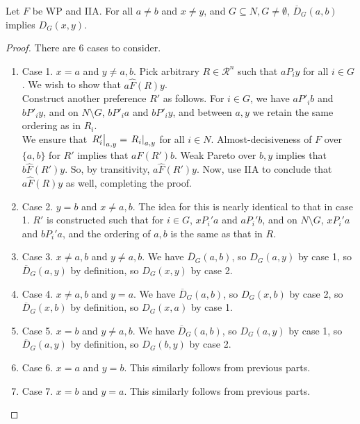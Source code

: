 	\begin{lemma}
		\label{lem: arrow field expansion}
		Let $F$ be WP and IIA. For all $a \ne b$ and $x \ne y$, and $G \subseteq N, G \ne \emptyset$,
		$\overline{D}_G(a,b)$ implies $D_G(x,y)$.
	\end{lemma}
	\begin{proof}
		There are $6$ cases to consider.
		\begin{enumerate}
			\item Case 1. $x = a$ and $y \ne a,b$. Pick arbitrary $R \in \mathcal{R}^n$ such that $a P_i y$ for all $i \in G$. We wish to show that $a \hat{F}(R) y$.\\
			Construct another preference $R'$ as follows. For $i \in G$, we have $a P'_i b$ and $b P'_i y$, and on $N \setminus G$, $b P'_i a$ and $b P'_i y$, and between $a,y$ we retain the same ordering as in $R_i$.\\
			We ensure that $\left.R_i'\right|_{a,y} = \left.R_i\right|_{a,y}$ for all $i \in N$. Almost-decisiveness of $F$ over $\{a,b\}$ for $R'$ implies that $a \hat{F}(R') b$. Weak Pareto over $b,y$ implies that $b \hat{F}(R') y$. So, by transitivity, $a \hat{F}(R') y$. Now, use IIA to conclude that $a \hat{F}(R) y$ as well, completing the proof.
			\item Case 2. $y = b$ and $x \ne a,b$. The idea for this is nearly identical to that in case 1. $R'$ is constructed such that for $i \in G$, $x P_i' a$ and $a P_i' b$, and on $N \setminus G$, $x P_i' a$ and $b P_i' a$, and the ordering of $a,b$ is the same as that in $R$.
			\item Case 3. $x \ne a,b$ and $y \ne a,b$. We have $\overline{D}_G(a,b)$, so $D_G(a,y)$ by case 1, so $\overline{D}_G(a,y)$ by definition, so $D_G(x,y)$ by case 2.
			\item Case 4. $x \ne a,b$ and $y = a$. We have $\overline{D}_G(a,b)$, so $D_G(x,b)$ by case 2, so $\overline{D}_G(x,b)$ by definition, so $D_G(x,a)$ by case 1.
			\item Case 5. $x = b$ and $y \ne a,b$. We have $\overline{D}_G(a,b)$, so $D_G(a,y)$ by case 1, so $\overline{D}_G(a,y)$ by definition, so $D_G(b,y)$ by case 2.
			\item Case 6. $x = a$ and $y = b$. This similarly follows from previous parts.
			\item Case 7. $x = b$ and $y = a$. This similarly follows from previous parts.
		\end{enumerate}
	\end{proof}

